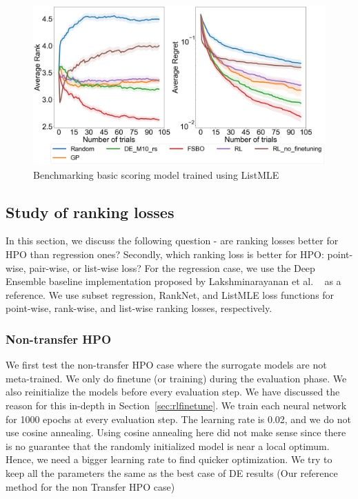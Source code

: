 \documentclass[12pt, twoside, ngerman]{report}
\begin{document}
\begin{figure}[h]
  \centering
    \includegraphics[scale=0.25]{images/RLEvaluationBasicScoring}
    \caption{Benchmarking basic scoring model trained using ListMLE}
    \label{fig:RLEvaluationBasicScoring}
\end{figure}
\fi

\subsection{Study of ranking losses}

In this section, we discuss the following question - are ranking losses better for HPO than regression ones? Secondly, which ranking loss is better for HPO: point-wise,  pair-wise, or list-wise loss?
For the regression case,  we use the Deep Ensemble baseline implementation proposed by Lakshminarayanan et al. ~\cite{DeepEnsemblePaper} as a reference. We use subset regression,  RankNet, and ListMLE loss functions for point-wise, rank-wise, and list-wise ranking losses, respectively. 

\subsubsection{Non-transfer HPO}
We first test the non-transfer HPO case where the surrogate models are not meta-trained. We only do finetune (or training) during the evaluation phase. We also reinitialize the models before every evaluation step. We have discussed the reason for this in-depth in Section~\ref{sec:rlfinetune}.
We train each neural network for 1000 epochs at every evaluation step. The learning rate is 0.02, and we do not use cosine annealing.
Using cosine annealing here did not make sense since there is no guarantee that the randomly initialized model is near a local optimum.
Hence, we need a bigger learning rate to find quicker optimization.
We try to keep all the parameters the same as the best case of DE results (Our reference method for the non Transfer HPO case)
\end{document}
